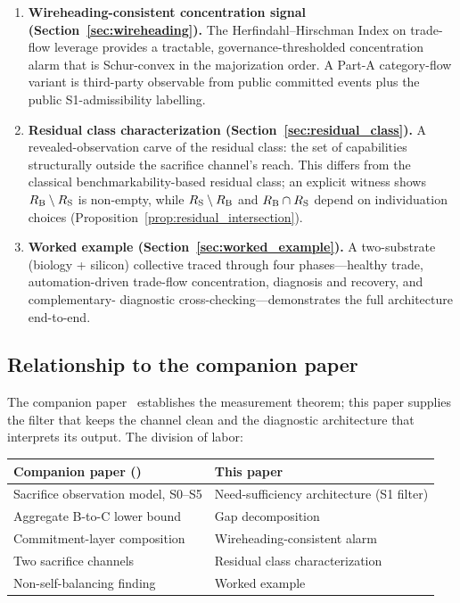 \begin{enumerate}
\item \textbf{Wireheading-consistent concentration signal
  (Section~\ref{sec:wireheading}).}
  The Herfindahl--Hirschman Index on trade-flow leverage
  provides a tractable, governance-thresholded concentration
  alarm that is Schur-convex in the majorization order.  A
  Part-A category-flow variant is third-party observable from
  public committed events plus the public S1-admissibility
  labelling.

\item \textbf{Residual class characterization
  (Section~\ref{sec:residual_class}).}
  A revealed-observation carve of the residual class: the set
  of capabilities structurally outside the sacrifice channel's
  reach.  This differs from the classical
  benchmarkability-based residual class; an explicit witness
  shows $R_{\mathrm{B}} \setminus R_{\mathrm{S}}$ is non-empty, while
  $R_{\mathrm{S}} \setminus R_{\mathrm{B}}$ and $R_{\mathrm{B}} \cap R_{\mathrm{S}}$ depend on
  individuation choices
  (Proposition~\ref{prop:residual_intersection}).

\item \textbf{Worked example
  (Section~\ref{sec:worked_example}).}
  A two-substrate (biology + silicon) collective traced through
  four phases---healthy trade, automation-driven trade-flow
  concentration, diagnosis and recovery, and complementary-
  diagnostic cross-checking---demonstrates the full architecture
  end-to-end.
\end{enumerate}

\subsection{Relationship to the companion paper}
\label{sec:companion_relationship}

The companion paper~\citep[Revealed~Sacrifice]{lasser2026paper8a} establishes
the measurement theorem; this paper supplies the filter that keeps the channel
clean and the diagnostic architecture that interprets its output.  The division
of labor:

\begin{center}
\small
\begin{tabular}{@{}ll@{}}
\toprule
\textbf{Companion paper} (\citep[Revealed~Sacrifice]{lasser2026paper8a})
  & \textbf{This paper} \\
\midrule
Sacrifice observation model, S0--S5
  & Need-sufficiency architecture
  (S1 filter) \\
Aggregate B-to-C lower bound
  & Gap decomposition \\
Commitment-layer composition
  & Wireheading-consistent alarm \\
Two sacrifice channels
  & Residual class characterization \\
Non-self-balancing finding
  & Worked example \\
\bottomrule
\end{tabular}
\end{center}

